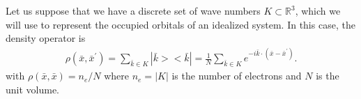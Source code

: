 \documentclass{article}
\newcommand{\beas}{\begin{eqnarray*}}
\newcommand{\enas}{\end{eqnarray*}}
\newcommand{\integers}{\mathbb{Z}}
\newcommand{\reals}{\mathbb{R}}
\begin{document}
Let us suppose that we have a discrete set of wave numbers $K \subset
\reals^3$, which we will use to represent the occupied orbitals of an
idealized system.  In this case, the density operator is
\beas
\rho(\bar{x},\bar{x}^\prime)
= \sum_{\bar{k} \in K} |\bar{k}><\bar{k}|
= \frac{1}{N} \sum_{\bar{k}\in K} e^{-i\bar{k} \cdot(\bar{x}-\bar{x}^\prime)}.
\enas
with $\rho(\bar{x},\bar{x}) = n_e/N$ where $n_e = |K|$ is the number of
electrons and $N$ is the unit volume.


\end{document}
